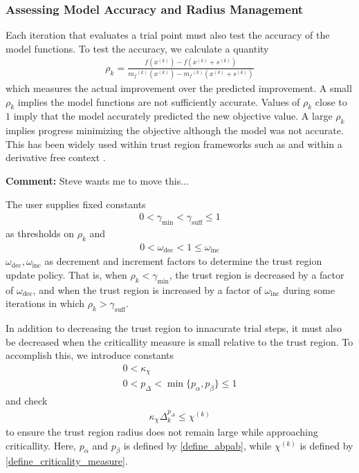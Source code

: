 \documentclass{article}
\newenvironment{comment}
  {\par\medskip
   \color{red}%
   \begin{framed}
   \textbf{Comment: }\ignorespaces}
 {\end{framed}
  \medskip}
\theoremstyle{case}
\numberwithin{theorem}{subsection}
\newcommand{\chik}{{\chi^{(k)}}}
\newcommand{\dk}{\Delta_k}
\newcommand{\gammabi}{\gamma_{\textrm{suff}}}
\newcommand{\gammasm}{\gamma_{\textrm{min}}}
\newcommand{\mfk}{{{m}_f}^{(k)}}
\newcommand{\omegadec}{\omega_{\text{dec}}}
\newcommand{\omegainc}{\omega_{\text{inc}}}
\newcommand{\rk}{\rho_k}
\newcommand{\sk}{{{s}^{(k)}}}
\newcommand{\xk}{x^{(k)}}
\begin{document}
\subsubsection{Assessing Model Accuracy and Radius Management}

Each iteration that evaluates a trial point must also test the accuracy of the model functions.
To test the accuracy, we calculate a quantity
\begin{align}
\label{define_rhok}
\rk = \frac{f(\xk) - f(\xk+\sk)}{\mfk(\xk) - \mfk(\xk+\sk)}
\end{align}
which measures the actual improvement over the predicted improvement.
A small $\rk$ implies the model functions are not sufficiently accurate.
Values of $\rk$ close to $1$ imply that the model accurately predicted the new objective value.
A large $\rk$ implies progress minimizing the objective although the model was not accurate.
This has been widely used within trust region frameworks such as \cite{Conn:2000:TM:357813} and within a derivative free context \cite{introduction_book}.

\begin{comment}
Steve wants me to move this...
\end{comment}
The user supplies fixed constants
\begin{align}
0 < \gammasm < \gammabi \le 1	\label{define_the_gammas}
\end{align}
as thresholds on $\rk$ and
\begin{align}
0 < \omegadec < 1 \le \omegainc		\label{define_the_omegas}
\end{align}
$\omegadec, \omegainc$ as decrement and increment factors to determine the trust region update policy.
That is, when $\rk < \gammasm$, the trust region is decreased by a factor of $\omegadec$, and when the trust region is increased by a factor of $\omegainc$
during some iterations in which $\rk > \gammabi$.

In addition to decreasing the trust region to innacurate trial steps, 
it must also be decreased when the criticallity measure is small relative to the trust region.
To accomplish this, we introduce constants
\begin{align}
0 < \kappa_{\chi} \label{define_kappa_chi} \\
0 < p_{\Delta} < \min\{p_{\alpha}, p_{\beta}\} \le 1 \label{define_p_delta} 
\end{align}
and check
\begin{align}
\kappa_{\chi} \dk^{p_{\Delta}} \le \chik \label{criticallity_check}
\end{align}
to ensure the trust region radius does not remain large while approaching criticallity.
Here,
$p_{\alpha}$ and $p_{\beta}$ is defined by \cref{define_abpab},
while $\chik$ is defined by \cref{define_criticality_measure}.
\end{document}
